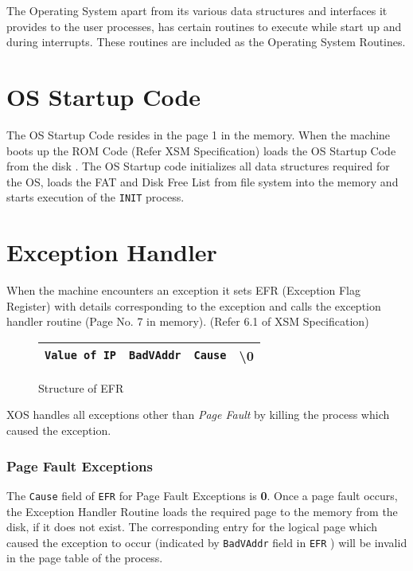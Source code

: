 \documentclass[10pt]{report}
\begin{document}
\label{chp:sys routines}

The Operating System apart from its various data structures and interfaces it provides to the user processes, has certain routines to execute while start up and during interrupts. These routines are included as the Operating System Routines.

\section{OS Startup Code}
\label{sec:os startup code}
The OS Startup Code resides in the page 1 in the memory. When the machine boots up the ROM Code (Refer XSM Specification) loads the OS Startup Code from the disk . The OS Startup code initializes all data structures required for the OS, loads the FAT and Disk Free List from file system into the memory and starts execution of the \texttt{INIT} process.

\section{Exception Handler}
\label{sec:ex_handler}
When the machine encounters an exception it sets EFR (Exception Flag Register) with details corresponding to the exception and calls the exception handler routine (Page No. 7 in memory).
(Refer 6.1 of XSM Specification)

		\begin{figure}[htp!]
		\centering
		\begin{tabular}{|c|c|c|c|}
		\hline
		\texttt{Value of IP} & \texttt{BadVAddr} & \texttt{Cause} &  \textbackslash 0 \\
		\hline
		\end{tabular}
		\caption{Structure of EFR }
		\end{figure}
		
XOS handles all  exceptions other than \textit{Page Fault} by killing the process which caused the exception. 

\subsubsection{Page Fault Exceptions}
\label{sec:page fault}
The \texttt{Cause} field of \texttt{EFR} for Page Fault Exceptions is\textbf{ 0}. Once a page fault occurs, the Exception Handler Routine loads the required page to the memory from the disk, if it does not exist. The corresponding entry for the logical page which caused the exception to occur (indicated by \texttt{BadVAddr} field in \texttt{EFR} ) will be invalid in the page table of the process. 
\end{document}
